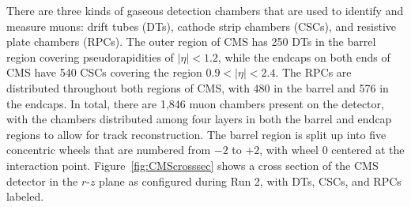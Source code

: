 There are three kinds of gaseous detection chambers that are used to identify and measure muons: drift tubes (DTs), cathode strip chambers (CSCs), and resistive plate chambers (RPCs).
The outer region of CMS has 250 DTs in the barrel region covering pseudorapidities of $|\eta|<1.2$, while the endcaps on both ends of CMS have 540 CSCs covering the region $0.9<|\eta|<2.4$.
The RPCs are distributed throughout both regions of CMS, with 480 in the barrel and 576 in the endcaps.
In total, there are 1,846 muon chambers present on the detector, with the chambers distributed among four layers in both the barrel and endcap regions to allow for track reconstruction.
The barrel region is split up into five concentric wheels that are numbered from $-2$ to $+2$, with wheel 0 centered at the interaction point.
Figure~\ref{fig:CMScrosssec} shows a cross section of the CMS detector in the $r$-$z$ plane as configured during Run 2, with DTs, CSCs, and RPCs labeled.

